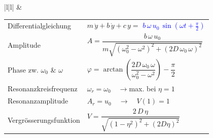 \begin{tabular}{|l|l|}
	& \begin{minipage}[]{12cm}
      \renewcommand{\arraystretch}{2}
		\begin{tabular}{ll}
    	Differentialgleichung
    		& $m\,\ddot{y}+b\,\dot{y}+c\,y=$
    		\textcolor{blue}{$b\,\omega\,u_0\,\sin(\omega t+\frac{\pi}{2})$} \\
    	Amplitude
    		&
    		$A=\dfrac{b\,\omega\,u_0}{m\sqrt{(\omega_0^2-\omega^2)^2+(2D\,\omega_0\,\omega)^2}}$ \\
    	Phase zw. $\omega_0$ \& $\omega$
    		&
    		$\varphi=\operatorname{arctan}\left(\dfrac{2D\,\omega_0\,\omega}{\omega_0^2-\omega^2}\right)-\dfrac{\pi}{2}$\\ 
    	Resonanzkreisfrequenz
    		& $\omega_r=\omega_0 \quad \rightarrow$\quad max. bei $\eta=1$\\
    	Resonanzamplitude
    		& $A_r=u_0\quad\rightarrow\quad V(1)=1$\\
    	Vergrösserungsfunktion
    		&
    		$V=\dfrac{2 \,D\, \eta}{\sqrt{(1-\eta^2)^2+(2D\eta)^2}}$ 
		\end{tabular}
    \end{minipage} \\
\hline
\end{tabular}
\newpage
